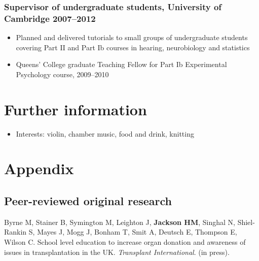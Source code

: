 \documentclass[a4paper, oneside, final, 11pt]{scrartcl} %
\begin{document}
\smallskip 

\subsubsection*{Supervisor of undergraduate students, University of Cambridge \hfill 2007--2012} 
\normalfont
\begin{itemize}
	\item Planned and delivered tutorials to small groups of undergraduate students covering Part II and Part Ib courses in hearing, neurobiology and statistics
	\item Queens' College graduate Teaching Fellow for Part Ib Experimental Psychology course, 2009--2010
\end{itemize}

\medskip


\section{Further information}
\begin{itemize}
	\item Interests: violin, chamber music, food and drink, knitting
\end{itemize}


\newpage

\section{Appendix}

\subsection*{Peer-reviewed original research}

Byrne M, Stainer B, Symington M, Leighton J, \textbf{Jackson HM}, Singhal N, Shiel-Rankin S, Mayes J, Mogg J, Bonham T, Smit A, Deutsch E, Thompson E, Wilson C. School level education to increase organ donation and awareness of issues in transplantation in the UK. \textit{Transplant International}. (in press).

\bigskip
\end{document}
